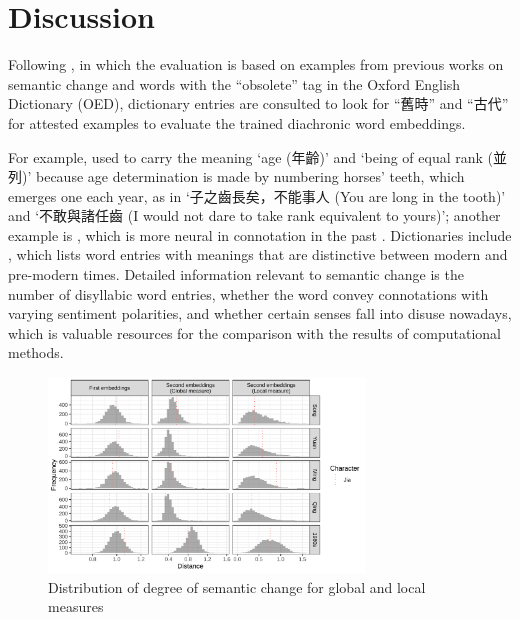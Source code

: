 

\section{Discussion}
Following \textcite{hamilton2016law}, in which the evaluation is based on examples from previous works on semantic change and words with the ``obsolete'' tag in the Oxford English Dictionary (OED), dictionary entries are consulted to look for ``舊時'' and ``古代'' for attested examples to evaluate the trained diachronic word embeddings.

For example,  used to carry the meaning `age (年齡)' and `being of equal rank (並列)' because age determination is made by numbering horses' teeth, which emerges one each year, as in `子之齒長矣，不能事人 (You are long in the tooth)' and `不敢與諸任齒 (I would not dare to take rank equivalent to yours)'; another example is , which is more neural in connotation in the past \parencite[前言]{wang1997gujinyiyi}. Dictionaries include \textcite{wang1997gujinyiyi,liu1992gujinyi}, which lists word entries with meanings that are distinctive between modern and pre-modern times. Detailed information relevant to semantic change is the number of disyllabic word entries, whether the word convey connotations with varying sentiment polarities, and whether certain senses fall into disuse nowadays, which is valuable resources for the comparison with the results of computational methods. 

\begin{figure}[H]
  \centering
  \includegraphics[width=0.75\textwidth,keepaspectratio]{figures_new/measures/dist_hist_w5.pdf}
  \caption{Distribution of degree of semantic change for global and local measures}
\end{figure}

